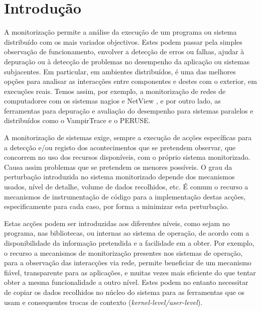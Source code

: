 \documentclass[a4paper]{llncs}
\begin{document}
\section{Introdução}
\label{sec:introduction}

A monitorização permite a análise da execução de um programa ou sistema distribuído com os mais variados objectivos.
 Estes podem passar pela simples observação de funcionamento, envolver a detecção de erros ou falhas, ajudar à depuração ou à detecção de problemas no desempenho da aplicação ou sistemas subjacentes.
 Em particular, em ambientes distribuídos, é uma das melhores opções para analisar as interacções entre componentes e destes com o exterior, em execuções reais. 
Temos assim, por exemplo, a monitorização de redes de computadores com os sistemas  nagios \cite{nagios} e NetView \cite{netview}, e por outro lado, as ferramentas para depuração e avaliação do desempenho para sistemas paralelos e distribuídos como o VampirTrace\cite{vampir:2008} e o PERUSE\cite{keller06}.




A monitorização de sistemas exige, sempre a execução de acções específicas para a detecção e/ou registo dos acontecimentos que se pretendem observar, que concorrem no uso dos recursos disponíveis, com o próprio sistema monitorizado.
 Causa assim problemas que se pretendem os menores possíveis.
 O grau da perturbação introduzida no sistema monitorizado depende dos mecanismos usados, nível de detalhe, volume de dados recolhidos, etc.  
É comum o recurso a mecanismos de instrumentação de código para a implementação destas acções, especificamente para cada caso, por forma a minimizar esta perturbação.

Estas acções podem ser introduzidas aos diferentes níveis, como sejam no programa, nas bibliotecas, ou internas ao sistema de operação, de acordo com a disponibilidade da informação pretendida e a facilidade em a obter.
Por exemplo, o recurso a mecanismos de monitorização presentes nos sistemas de operação, para a observação das interacções via rede, permite beneficiar de um mecanismo fiável, transparente para as aplicações, e muitas vezes mais eficiente do que tentar obter a mesma funcionalidade a outro nível.
 Estes podem no entanto necessitar de copiar os dados recolhidos no núcleo do sistema para as ferramentas que os usam e consequentes trocas de contexto (\emph{kernel-level/user-level}).
\end{document}
